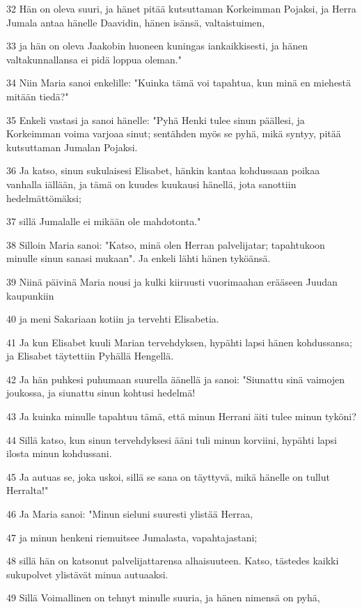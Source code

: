\par 32 Hän on oleva suuri, ja hänet pitää kutsuttaman Korkeimman Pojaksi, ja Herra Jumala antaa hänelle Daavidin, hänen isänsä, valtaistuimen,
\par 33 ja hän on oleva Jaakobin huoneen kuningas iankaikkisesti, ja hänen valtakunnallansa ei pidä loppua oleman."
\par 34 Niin Maria sanoi enkelille: "Kuinka tämä voi tapahtua, kun minä en miehestä mitään tiedä?"
\par 35 Enkeli vastasi ja sanoi hänelle: "Pyhä Henki tulee sinun päällesi, ja Korkeimman voima varjoaa sinut; sentähden myös se pyhä, mikä syntyy, pitää kutsuttaman Jumalan Pojaksi.
\par 36 Ja katso, sinun sukulaisesi Elisabet, hänkin kantaa kohdussaan poikaa vanhalla iällään, ja tämä on kuudes kuukausi hänellä, jota sanottiin hedelmättömäksi;
\par 37 sillä Jumalalle ei mikään ole mahdotonta."
\par 38 Silloin Maria sanoi: "Katso, minä olen Herran palvelijatar; tapahtukoon minulle sinun sanasi mukaan". Ja enkeli lähti hänen tyköänsä.
\par 39 Niinä päivinä Maria nousi ja kulki kiiruusti vuorimaahan erääseen Juudan kaupunkiin
\par 40 ja meni Sakariaan kotiin ja tervehti Elisabetia.
\par 41 Ja kun Elisabet kuuli Marian tervehdyksen, hypähti lapsi hänen kohdussansa; ja Elisabet täytettiin Pyhällä Hengellä.
\par 42 Ja hän puhkesi puhumaan suurella äänellä ja sanoi: "Siunattu sinä vaimojen joukossa, ja siunattu sinun kohtusi hedelmä!
\par 43 Ja kuinka minulle tapahtuu tämä, että minun Herrani äiti tulee minun tyköni?
\par 44 Sillä katso, kun sinun tervehdyksesi ääni tuli minun korviini, hypähti lapsi ilosta minun kohdussani.
\par 45 Ja autuas se, joka uskoi, sillä se sana on täyttyvä, mikä hänelle on tullut Herralta!"
\par 46 Ja Maria sanoi: "Minun sieluni suuresti ylistää Herraa,
\par 47 ja minun henkeni riemuitsee Jumalasta, vapahtajastani;
\par 48 sillä hän on katsonut palvelijattarensa alhaisuuteen. Katso, tästedes kaikki sukupolvet ylistävät minua autuaaksi.
\par 49 Sillä Voimallinen on tehnyt minulle suuria, ja hänen nimensä on pyhä,
